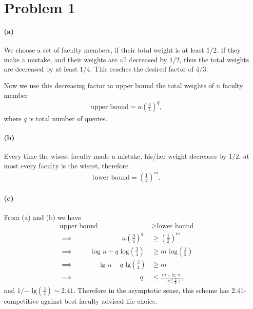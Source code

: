 \documentclass[12pt]{article}
\begin{document}
\section*{Problem 1}
\paragraph{(a)} We choose a set of faculty members, if their total weight is at least $1/2$. If they make a mistake, and their weights are all decreased by $1/2$, thus the total weights are decreased by at least $1/4$. This reaches the desired factor of $4/3$.

Now we use this decreasing factor to upper bound the total weights of $n$ faculty member
\begin{align*}
\text{upper bound} = n\left(\frac{3}{4}\right)^q,
\end{align*}
where $q$ is total number of queries. 

\paragraph{(b)} 
Every time the wisest faculty made a mistake, his/her weight decreases by $1/2$, at most every faculty is the wisest, therefore
\begin{align*}
\text{lower bound} = \left(\frac{1}{2}\right)^m.
\end{align*}

\paragraph{(c)}
From (a) and (b) we have 
\begin{align*}
\text{upper bound} &\geq \text{lower bound}\\
\implies\:\:\:\:\:\:\:\:\:\:\:\:\:\:\:\:\:\:\:\:\:\:\:\:\:\:\:\:\:\:\:\: n\left(\frac{3}{4}\right)^q &\geq \left(\frac{1}{2}\right)^m\\
\implies\:\:\:\:\:\:\:\:\:\:\:\: \text{log } n + q\text{ log} \left(\frac{3}{4}\right) &\geq m\text{ log}\left(\frac{1}{2}\right)\\
\implies\:\:\:\:\:\:\:\:\:\:\:\: -\text{lg } n - q\text{ lg} \left(\frac{3}{4}\right) &\geq m\\
\implies\:\:\:\:\:\:\:\:\:\:\:\:\:\:\:\:\:\:\:\:\:\:\:\:\:\:\:\:\:\:\:\:\:\:\:\:\:\:\:\:\:\:\:\: q &\leq \frac{m + \text{lg } n}{-\text{ lg} \left(\frac{3}{4}\right)},
\end{align*}
and $1/{-\text{ lg} \left(\frac{3}{4}\right)} \sim 2.41$. Therefore in the asymptotic sense, this scheme has 2.41-competitive against best faculty advised life choice. 
\end{document}
